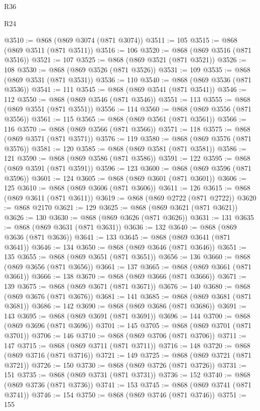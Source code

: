 \begin{lexlean}{R36}
\begin{lexlean}{R24}
\begin{coremodule}
{{{{{{{{{{{{{{{{{{{{{{{{{{{{{{{{{{{{{{{{{{{{{{{{{{{{{{{{{{{{{{{{{{{{{{{{{{{{{{{{{{{{{{{{{{{{{{{{{{{{{{{{{{{{{{{{{{{{{{{{{{{{{{{{{{{{{{{{{{{{{{{{{{{{{{{{{{{{{{{{{{{{{{{{{{{{{{{{{{{{{{{{{{{{{{{{{{{@3510 := @868 (@869 @3074 (@871 @3074))
@3511 := 105
@3515 := @868 (@869 @3511 (@871 @3511))
@3516 := 106
@3520 := @868 (@869 @3516 (@871 @3516))
@3521 := 107
@3525 := @868 (@869 @3521 (@871 @3521))
@3526 := 108
@3530 := @868 (@869 @3526 (@871 @3526))
@3531 := 109
@3535 := @868 (@869 @3531 (@871 @3531))
@3536 := 110
@3540 := @868 (@869 @3536 (@871 @3536))
@3541 := 111
@3545 := @868 (@869 @3541 (@871 @3541))
@3546 := 112
@3550 := @868 (@869 @3546 (@871 @3546))
@3551 := 113
@3555 := @868 (@869 @3551 (@871 @3551))
@3556 := 114
@3560 := @868 (@869 @3556 (@871 @3556))
@3561 := 115
@3565 := @868 (@869 @3561 (@871 @3561))
@3566 := 116
@3570 := @868 (@869 @3566 (@871 @3566))
@3571 := 118
@3575 := @868 (@869 @3571 (@871 @3571))
@3576 := 119
@3580 := @868 (@869 @3576 (@871 @3576))
@3581 := 120
@3585 := @868 (@869 @3581 (@871 @3581))
@3586 := 121
@3590 := @868 (@869 @3586 (@871 @3586))
@3591 := 122
@3595 := @868 (@869 @3591 (@871 @3591))
@3596 := 123
@3600 := @868 (@869 @3596 (@871 @3596))
@3601 := 124
@3605 := @868 (@869 @3601 (@871 @3601))
@3606 := 125
@3610 := @868 (@869 @3606 (@871 @3606))
@3611 := 126
@3615 := @868 (@869 @3611 (@871 @3611))
@3619 := @868 (@869 @2722 (@871 @2722))
@3620 := @868 @2170
@3621 := 129
@3625 := @868 (@869 @3621 (@871 @3621))
@3626 := 130
@3630 := @868 (@869 @3626 (@871 @3626))
@3631 := 131
@3635 := @868 (@869 @3631 (@871 @3631))
@3636 := 132
@3640 := @868 (@869 @3636 (@871 @3636))
@3641 := 133
@3645 := @868 (@869 @3641 (@871 @3641))
@3646 := 134
@3650 := @868 (@869 @3646 (@871 @3646))
@3651 := 135
@3655 := @868 (@869 @3651 (@871 @3651))
@3656 := 136
@3660 := @868 (@869 @3656 (@871 @3656))
@3661 := 137
@3665 := @868 (@869 @3661 (@871 @3661))
@3666 := 138
@3670 := @868 (@869 @3666 (@871 @3666))
@3671 := 139
@3675 := @868 (@869 @3671 (@871 @3671))
@3676 := 140
@3680 := @868 (@869 @3676 (@871 @3676))
@3681 := 141
@3685 := @868 (@869 @3681 (@871 @3681))
@3686 := 142
@3690 := @868 (@869 @3686 (@871 @3686))
@3691 := 143
@3695 := @868 (@869 @3691 (@871 @3691))
@3696 := 144
@3700 := @868 (@869 @3696 (@871 @3696))
@3701 := 145
@3705 := @868 (@869 @3701 (@871 @3701))
@3706 := 146
@3710 := @868 (@869 @3706 (@871 @3706))
@3711 := 147
@3715 := @868 (@869 @3711 (@871 @3711))
@3716 := 148
@3720 := @868 (@869 @3716 (@871 @3716))
@3721 := 149
@3725 := @868 (@869 @3721 (@871 @3721))
@3726 := 150
@3730 := @868 (@869 @3726 (@871 @3726))
@3731 := 151
@3735 := @868 (@869 @3731 (@871 @3731))
@3736 := 152
@3740 := @868 (@869 @3736 (@871 @3736))
@3741 := 153
@3745 := @868 (@869 @3741 (@871 @3741))
@3746 := 154
@3750 := @868 (@869 @3746 (@871 @3746))
@3751 := 155
}}}}}}}}}}}}}}}}}}}}}}}}}}}}}}}}}}}}}}}}}}}}}}}}}}}}}}}}}}}}}}}}}}}}}}}}}}}}}}}}}}}}}}}}}}}}}}}}}}}}}}}}}}}}}}}}}}}}}}}}}}}}}}}}}}}}}}}}}}}}}}}}}}}}}}}}}}}}}}}}}}}}}}}}}}}}}}}}}}}}}}}}}}}}}}}}}}}
\end{coremodule}
\end{lexlean}
\end{lexlean}
